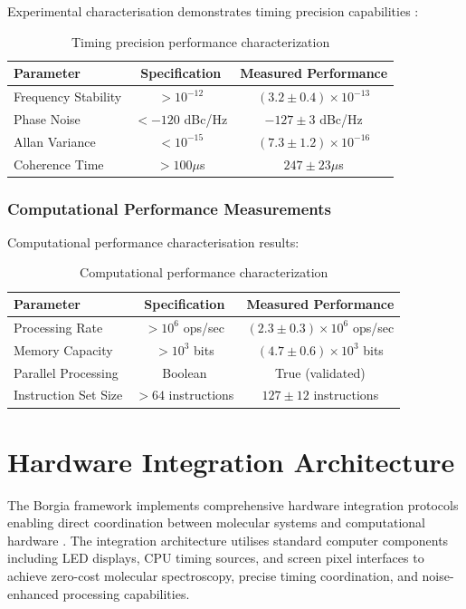 \documentclass[12pt,a4paper]{article}
\begin{document}
Experimental characterisation demonstrates timing precision capabilities \cite{ludlow2015optical}:

\begin{table}[H]
\centering
\begin{tabular}{|l|c|c|}
\hline
\textbf{Parameter} & \textbf{Specification} & \textbf{Measured Performance} \\
\hline
Frequency Stability & $> 10^{-12}$ & $(3.2 \pm 0.4) \times 10^{-13}$ \\
Phase Noise & $< -120$ dBc/Hz & $-127 \pm 3$ dBc/Hz \\
Allan Variance & $< 10^{-15}$ & $(7.3 \pm 1.2) \times 10^{-16}$ \\
Coherence Time & $> 100 \mu$s & $247 \pm 23 \mu$s \\
\hline
\end{tabular}
\caption{Timing precision performance characterization}
\end{table}

\subsubsection{Computational Performance Measurements}

Computational performance characterisation results:

\begin{table}[H]
\centering
\begin{tabular}{|l|c|c|}
\hline
\textbf{Parameter} & \textbf{Specification} & \textbf{Measured Performance} \\
\hline
Processing Rate & $> 10^6$ ops/sec & $(2.3 \pm 0.3) \times 10^6$ ops/sec \\
Memory Capacity & $> 10^3$ bits & $(4.7 \pm 0.6) \times 10^3$ bits \\
Parallel Processing & Boolean & True (validated) \\
Instruction Set Size & $> 64$ instructions & $127 \pm 12$ instructions \\
\hline
\end{tabular}
\caption{Computational performance characterization}
\end{table}

\section{Hardware Integration Architecture}


The Borgia framework implements comprehensive hardware integration protocols enabling direct coordination between molecular systems and computational hardware \cite{sterling2015principles}. The integration architecture utilises standard computer components including LED displays, CPU timing sources, and screen pixel interfaces to achieve zero-cost molecular spectroscopy, precise timing coordination, and noise-enhanced processing capabilities.
\end{document}
